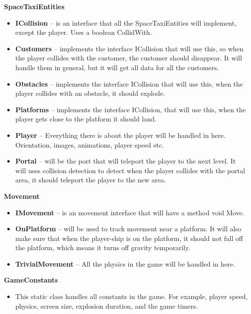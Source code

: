 \documentclass[../master.tex]{subfile}
\begin{document}
\textbf{SpaceTaxiEntities}
\begin{itemize}
	\item[] \textbf{ICollision} -- is an interface that all the SpaceTaxiEntities will implement, except the player. Uses a boolean CollidWith.
	\item[] \textbf{Customers} -- implements the interface ICollision that will use this, so when the player collides with the customer, the customer should disappear. It will handle them in general, but it will get all data for all the customers.
	\item[] \textbf{Obstacles} -- implements the interface ICollision that will use this, when the player collides with an obstacle, it should explode.
	\item[] \textbf{Platforms} -- implements the interface ICollision, that will use this, when the player gets close to the platform it should land.
	\item[] \textbf{Player} -- Everything there is about the player will be handled in here. Orientation, images, animations, player speed etc.
	\item[] \textbf{Portal} -- will be the port that will teleport the player to the next level. It will uses collision detection to detect when the player collides with the portal area, it should teleport the player to the new area.\\
\end{itemize}

\textbf{Movement}
\begin{itemize}
	\item[] \textbf{IMovement} -- is an movement interface that will have a method void Move.
	\item[] \textbf{OnPlatform} -- will be used to track movement near a platform. It will also make sure that when the player-ship is on the platform, it should not fall off the platform, which means it turns off gravity temporarily.
	\item[] \textbf{TrivialMovement} -- All the physics in the game will be handled in here.\\
\end{itemize}

\textbf{GameConstants}
\begin{itemize}
	\item[] This static class handles all constants in the game. For example, player speed, physics, screen size, explosion duration, and the game timers.
\end{itemize}
\end{document}
